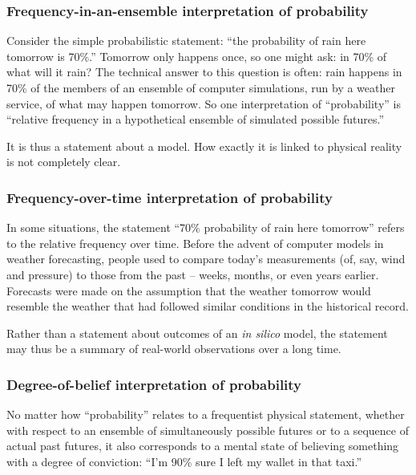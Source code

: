 \documentclass[a4paper, 12pt]{article}
\begin{document}
\subsubsection*{Frequency-in-an-ensemble interpretation of probability}
Consider the simple probabilistic statement: ``the probability of rain here tomorrow is 70\%.'' Tomorrow only happens once, so one might ask: in 70\% of what will it rain? The technical answer to this question is often: rain happens in 70\% of the members of an ensemble of computer simulations, run by a weather service, of what may happen tomorrow. So one interpretation of ``probability'' is ``relative frequency in a hypothetical ensemble of simulated possible futures.''

It is thus a statement about a model. How exactly it is linked to physical reality is not completely clear.


\subsubsection*{Frequency-over-time interpretation of probability}
In some situations, the statement ``70\% probability of rain here tomorrow'' refers to the relative frequency over time. Before the advent of computer models in weather forecasting, people used to compare today's measurements (of, say, wind and pressure) to those from the past -- weeks, months, or even years earlier. Forecasts were made on the assumption that the weather tomorrow would resemble the weather that had followed similar conditions in the historical record.

Rather than a statement about outcomes of an \textit{in silico} model, the statement may thus be a summary of real-world observations over a long time.

\subsubsection*{Degree-of-belief interpretation of probability}
No matter how ``probability'' relates to a frequentist physical statement, whether with respect to an ensemble of simultaneously possible futures or to a sequence of actual past futures, it also corresponds to a mental state of believing something with a degree of conviction: ``I'm 90\% sure I left my wallet in that taxi.''
\end{document}
